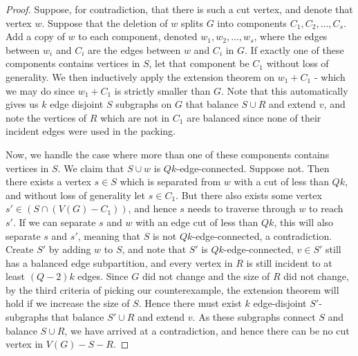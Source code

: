 \documentclass{article}
\begin{document}
\begin{proof}
    Suppose, for contradiction, that there is such a cut vertex, and denote that vertex $w$. Suppose that the deletion of $w$ splits $G$ into components $C_1, C_2,...,C_s$. Add a copy of $w$ to each component, denoted $w_1,w_2,...,w_s$, where the edges between $w_i$ and $C_i$ are the edges between $w$ and $C_i$ in $G$. If exactly one of these components contains vertices in $S$, let that component be $C_1$ without loss of generality. We then inductively apply the extension theorem on $w_1+C_1$ - which we may do since $w_1+C_1$ is strictly smaller than $G$. Note that this automatically gives us $k$ edge disjoint $S$ subgraphs on $G$ that balance $S \cup R$ and extend $v$, and note the vertices of $R$ which are not in $C_1$ are balanced since none of their incident edges were used in the packing. 

    Now, we handle the case where more than one of these components contains vertices in $S$. We claim that $S \cup w$ is $Qk$-edge-connected. Suppose not. Then there exists a vertex $s \in S$ which is separated from $w$ with a cut of less than $Qk$, and without loss of generality let $s \in C_1$. But there also exists some vertex $s' \in (S \cap (V(G)-C_1))$, and hence $s$ needs to traverse through $w$ to reach $s'$. If we can separate $s$ and $w$ with an edge cut of less than $Qk$, this will also separate $s$ and $s'$, meaning that $S$ is not $Qk$-edge-connected, a contradiction. Create $S'$ by adding $w$ to $S$, and note that $S'$ is $Qk$-edge-connected, $v \in S'$ still has a balanced edge subpartition, and every vertex in $R$ is still incident to at least $(Q-2)k$ edges. Since $G$ did not change and the size of $R$ did not change, by the third criteria of picking our counterexample, the extension theorem will hold if we increase the size of $S$. Hence there must exist $k$ edge-disjoint $S'$-subgraphs that balance $S' \cup R$ and extend $v$. As these subgraphs connect $S$ and balance $S \cup R$, we have arrived at a contradiction, and hence there can be no cut vertex in $V(G)-S-R$.

    

\end{proof}
\end{document}
